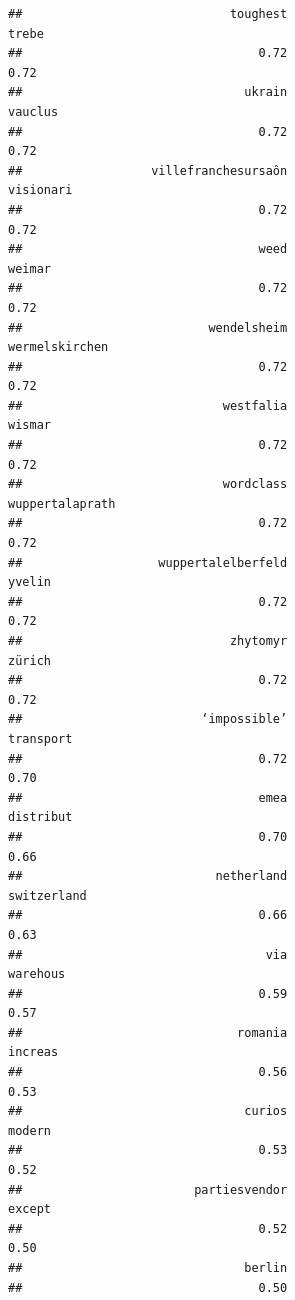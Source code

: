 \documentclass[
]{article}
\begin{document}
\begin{verbatim}
##                             toughest                                trebe 
##                                 0.72                                 0.72 
##                               ukrain                              vauclus 
##                                 0.72                                 0.72 
##                  villefranchesursaôn                            visionari 
##                                 0.72                                 0.72 
##                                 weed                               weimar 
##                                 0.72                                 0.72 
##                          wendelsheim                       wermelskirchen 
##                                 0.72                                 0.72 
##                            westfalia                               wismar 
##                                 0.72                                 0.72 
##                            wordclass                      wuppertalaprath 
##                                 0.72                                 0.72 
##                   wuppertalelberfeld                               yvelin 
##                                 0.72                                 0.72 
##                             zhytomyr                               zürich 
##                                 0.72                                 0.72 
##                         ‘impossible’                            transport 
##                                 0.72                                 0.70 
##                                 emea                            distribut 
##                                 0.70                                 0.66 
##                           netherland                          switzerland 
##                                 0.66                                 0.63 
##                                  via                             warehous 
##                                 0.59                                 0.57 
##                              romania                              increas 
##                                 0.56                                 0.53 
##                               curios                               modern 
##                                 0.53                                 0.52 
##                        partiesvendor                               except 
##                                 0.52                                 0.50 
##                               berlin 
##                                 0.50
\end{verbatim}
\end{document}
